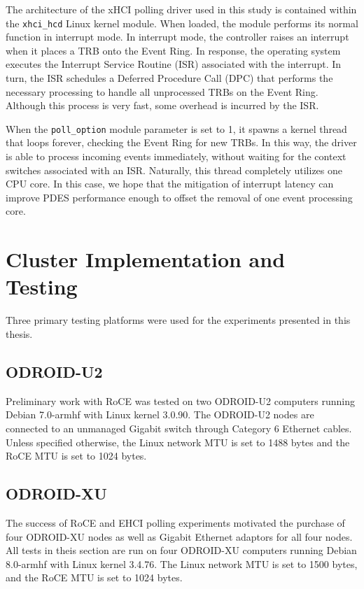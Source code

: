 \documentclass[11pt]{book}
\begin{document}
The architecture of the xHCI polling driver used in this study is contained
within the \verb;xhci_hcd; Linux kernel module. When loaded, the module performs
its normal function in interrupt mode. In interrupt mode, the controller raises
an interrupt when it places a TRB onto the Event Ring. In response, the
operating system executes the Interrupt Service Routine (ISR) associated with the
interrupt. In turn, the ISR schedules a Deferred Procedure Call (DPC) that
performs the necessary processing to handle all unprocessed TRBs on the Event
Ring. Although this process is very fast, some overhead is incurred by the ISR.

When the \verb;poll_option; module parameter is set to 1, it spawns a kernel
thread that loops forever, checking the Event Ring for new TRBs. In this way,
the driver is able to process incoming events immediately, without waiting for
the context switches associated with an ISR. Naturally, this thread completely
utilizes one CPU core. In this case, we hope that the mitigation of interrupt
latency can improve PDES performance enough to offset the removal of one event
processing core.

\newpage
\chapter{Cluster Implementation and Testing}
\label{cluster}

Three primary testing platforms were used for the experiments presented in this
thesis.

\section{\textbf{ODROID-U2}}

Preliminary work with RoCE was tested on two ODROID-U2 computers running Debian
7.0-armhf with Linux kernel 3.0.90. The ODROID-U2 nodes are connected to an
unmanaged Gigabit switch through Category 6 Ethernet cables. Unless specified
otherwise, the Linux network MTU is set to 1488 bytes and the RoCE MTU is set to
1024 bytes.

\section{\textbf{ODROID-XU}}

The success of RoCE and EHCI polling experiments motivated the purchase of four
ODROID-XU nodes as well as Gigabit Ethernet adaptors for all four nodes. All
tests in theis section are run on four ODROID-XU computers running Debian
8.0-armhf with Linux kernel 3.4.76. The Linux network MTU is set to 1500 bytes,
and the RoCE MTU is set to 1024 bytes.
\end{document}
